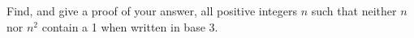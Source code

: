 Find, and give a proof of your answer, all positive integers $n$ such that
neither $n$ nor $n^2$ contain a 1 when written in base 3.
